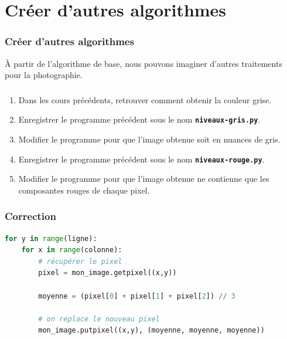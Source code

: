 \documentclass[svgnames,11pt]{beamer}
\begin{document}
\section{Créer d'autres algorithmes}
\begin{frame}
    \frametitle{Créer d'autres algorithmes}

    À partir de l'algorithme de base, nous pouvons imaginer d'autres traitements pour la photographie.

\end{frame}
\begin{frame}
    \frametitle{}

    \begin{activite}
        \begin{enumerate}
            \item Dans les cours précédents, retrouver comment obtenir la couleur grise.
            \item Enregistrer le programme précédent sous le nom \texttt{\textbf{niveaux-gris.py}}.
            \item Modifier le programme pour que l'image obtenue soit en nuances de gris.
            \item Enregistrer le programme précédent sous le nom \texttt{\textbf{niveaux-rouge.py}}.
            \item Modifier le programme pour que l'image obtenue ne contienne que les composantes rouges de chaque pixel.
        \end{enumerate}
    \end{activite}

\end{frame}
\begin{frame}[fragile]
    \frametitle{Correction}

\begin{center}
\begin{lstlisting}[language=Python , basicstyle=\ttfamily\small, xleftmargin=1em, xrightmargin=1em]
for y in range(ligne):
    for x in range(colonne):
        # récupérer le pixel
        pixel = mon_image.getpixel((x,y))

        moyenne = (pixel[0] + pixel[1] + pixel[2]) // 3

        # on replace le nouveau pixel
        mon_image.putpixel((x,y), (moyenne, moyenne, moyenne))
\end{lstlisting}
\label{CODE}
\end{center}

\end{frame}
\end{document}
